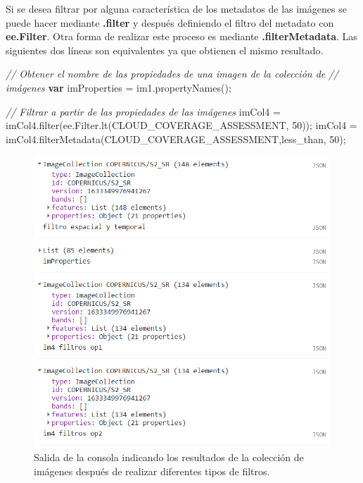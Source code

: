 \documentclass[
  12pt,
  letterpaper,
  twoside]{book}
\newenvironment{Shaded}{\begin{snugshade}}{\end{snugshade}}
\newcommand{\AttributeTok}[1]{\textcolor[rgb]{0.48,0.12,0.64}{#1}}
\newcommand{\CommentTok}[1]{\textcolor[rgb]{0.24,0.58,0.00}{\textit{#1}}}
\newcommand{\DecValTok}[1]{\textcolor[rgb]{0.28,0.53,0.93}{#1}}
\newcommand{\FunctionTok}[1]{\textcolor[rgb]{0.48,0.12,0.64}{#1}}
\newcommand{\KeywordTok}[1]{\textcolor[rgb]{0.00,0.00,0.00}{\textbf{#1}}}
\newcommand{\NormalTok}[1]{#1}
\newcommand{\OperatorTok}[1]{\textcolor[rgb]{0.00,0.00,0.00}{#1}}
\newcommand{\StringTok}[1]{\textcolor[rgb]{0.87,0.29,0.22}{#1}}
\newcommand\boldpurple[1]{\textcolor{darkpurple}{\textbf{#1}}}
\begin{document}
Si se desea filtrar por alguna característica de los metadatos de las imágenes se puede hacer mediante \boldpurple{.filter} y después definiendo el filtro del metadato con \boldpurple{ee.Filter}. Otra forma de realizar este proceso es mediante \boldpurple{.filterMetadata}. Las siguientes dos líneas son equivalentes ya que obtienen el mismo resultado.

\begin{Shaded}
\begin{Highlighting}[]
\CommentTok{// Obtener el nombre de las propiedades de una imagen de la colección de }
\CommentTok{// imágenes}
\KeywordTok{var}\NormalTok{ imProperties }\OperatorTok{=}\NormalTok{ im1}\OperatorTok{.}\FunctionTok{propertyNames}\NormalTok{()}\OperatorTok{;}

\CommentTok{// Filtrar a partir de las propiedades de las imágenes}
\NormalTok{imCol4 }\OperatorTok{=}\NormalTok{ imCol4}\OperatorTok{.}\FunctionTok{filter}\NormalTok{(ee}\OperatorTok{.}\AttributeTok{Filter}\OperatorTok{.}\FunctionTok{lt}\NormalTok{(}\StringTok{\textquotesingle{}CLOUD\_COVERAGE\_ASSESSMENT\textquotesingle{}}\OperatorTok{,} \DecValTok{50}\NormalTok{))}\OperatorTok{;}
\NormalTok{imCol4 }\OperatorTok{=}\NormalTok{ imCol4}\OperatorTok{.}\FunctionTok{filterMetadata}\NormalTok{(}\StringTok{\textquotesingle{}CLOUD\_COVERAGE\_ASSESSMENT\textquotesingle{}}\OperatorTok{,}\StringTok{\textquotesingle{}less\_than\textquotesingle{}}\OperatorTok{,} \DecValTok{50}\NormalTok{)}\OperatorTok{;}
\end{Highlighting}
\end{Shaded}

\begin{figure}[H]

{\centering \includegraphics[width=0.8\linewidth]{Img/filtroEspacialTemporal} 

}

\caption{Salida de la consola indicando los resultados de la colección de imágenes después de realizar diferentes tipos de filtros.}\label{fig:f104}
\end{figure}
\end{document}
